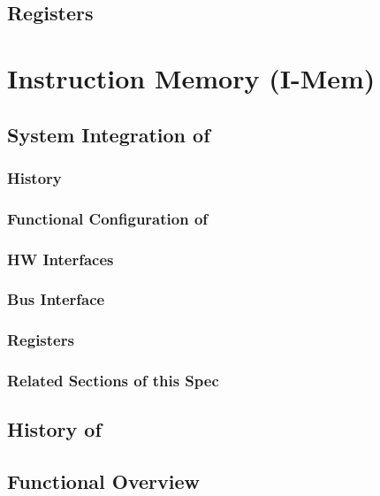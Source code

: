 \subsection{Registers}


\section{Instruction Memory (I-Mem)}
\label{sec:imemfunc01}
\subsection{System Integration of \asimem}
\subsubsection{History}


\subsubsection{Functional Configuration of \asimem}


\subsubsection{HW Interfaces}


\subsubsection{Bus Interface}

\subsubsection{Registers}

\subsubsection{Related Sections of this Spec}

\subsection{History of \asimemg}

\subsection{Functional Overview}
\label{subsec:imemfunc01}

